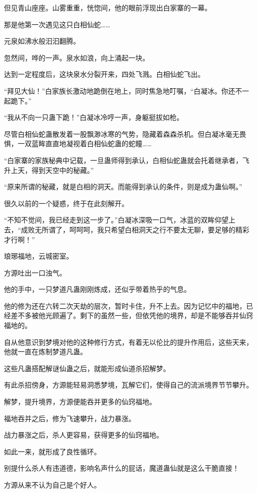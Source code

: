 \begin{this_body}
但见青山座座。山雾重重，恍惚间，他的眼前浮现出白家寨的一幕。

那是他第一次遇见这只白相仙蛇……

元泉如沸水般汩汩翻腾。

忽然间，哗的一声。泉水如浪，向上涌起一块。

达到一定程度后，这块泉水分裂开来，四处飞溅。白相仙蛇飞出。

“拜见大仙！”白家族长激动地跪倒在地上，同时焦急地叮嘱，“白凝冰。你还不一起跪下。”

“我从不向一只蛊下跪！”白凝冰冷哼一声，身躯挺拔如枪。

尽管白相仙蛇蛊散发着一股飘渺冰寒的气势，隐藏着森森杀机。但白凝冰毫无畏惧，一双蓝眸直直地凝视着白相仙蛇蛊的蛇瞳……

“白家寨的家族秘典中记载，一旦蛊师得到承认，白相仙蛇蛊就会托着继承者，飞升上天，得到天空中的秘藏。”

“原来所谓的秘藏，就是白相的洞天。而能得到承认的条件，则是成为蛊仙啊。”

很久以前的一个疑惑，终于在此刻解开。

“不知不觉间，我已经走到这一步了。”白凝冰深吸一口气，冰蓝的双眸仰望上去，“成败无所谓了，呵呵呵，我只希望白相洞天之行不要太无聊，要足够的精彩才行啊！”

琅琊福地，云城密室。

方源吐出一口浊气。

他的手中，一只梦道凡蛊刚刚炼成，还似乎带着热乎的气息。

他的修为还在六转二次天劫的层次，暂时卡住，升不上去。因为记忆中的福地，已经差不多被他光顾遍了。剩下的虽然一些，但依凭他的境界，却是不能够吞并仙窍福地的。

自从他意识到梦境对他的这种修行方式，有着无以伦比的提升作用后，这些天来，他就一直在炼制梦道凡蛊。

这些凡蛊搭配解谜仙蛊之后，就能形成仙道杀招解梦。

有此杀招傍身，方源能轻易洞悉梦境，瓦解它们，使得自己的流派境界节节攀升。

解梦，提升境界，方源便能吞并更多的仙窍福地。

福地吞并之后，修为飞速攀升，战力暴涨。

战力暴涨之后，杀人更容易，获得更多的仙窍福地。

如此一来，就形成了良性循环。

别提什么杀人有违道德，影响名声什么的屁话，魔道蛊仙就是这么干脆直接！

方源从来不认为自己是个好人。


\end{this_body}
